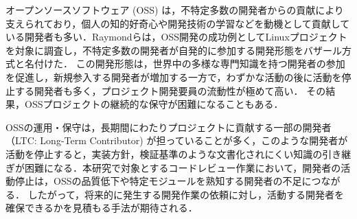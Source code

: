 \documentclass[submit,noauthor,ses,dvipdfmx]{ipsj}
\newcommand{\todo}[1]{\colorbox{yellow}{{\bf TODO}:}{\color{red} {\textbf{[#1]}}}}
\begin{document}
オープンソースソフトウェア (OSS) は，不特定多数の開発者からの貢献により支えられており，個人の知的好奇心や開発技術の学習などを動機として貢献している開発者も多い\cite{motivation}．Raymondらは，OSS開発の成功例としてLinuxプロジェクトを対象に調査し，不特定多数の開発者が自発的に参加する開発形態をバザール方式と名付けた\cite{bazzar}．
この開発形態は，世界中の多様な専門知識を持つ開発者の参加を促進し，新規参入する開発者が増加する一方で，わずかな活動の後に活動を停止する開発者も多く，プロジェクト開発要員の流動性が極めて高い\cite{dynamics}．%
その結果，OSSプロジェクトの継続的な保守が困難になることもある\cite{pinto_otc}．

OSSの運用・保守は，長期間にわたりプロジェクトに貢献する一部の開発者（LTC: Long-Term Contributor) が担っていることが多く，このような開発者が活動を停止すると，実装方針，検証基準のような文書化されにくい知識の引き継ぎが困難になる．本研究で対象とするコードレビュー作業において，開発者の活動停止は，OSSの品質低下や特定モジュールを熟知する開発者の不足につながる\cite{bacchelli}\cite{mcintosh}．
したがって，将来的に発生する開発作業の依頼に対し，活動する開発者を確保できるかを見積もる手法が期待される．
\end{document}
